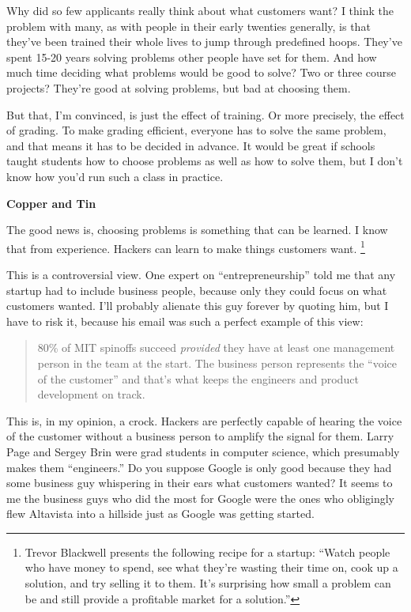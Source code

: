 Why did so few applicants really think about what customers want? I
think the problem with many, as with people in their early twenties
generally, is that they've been trained their whole lives to jump
through predefined hoops. They've spent 15-20 years solving problems
other people have set for them. And how much time deciding what problems
would be good to solve? Two or three course projects? They're good at
solving problems, but bad at choosing them.

But that, I'm convinced, is just the effect of training. Or more
precisely, the effect of grading. To make grading efficient, everyone
has to solve the same problem, and that means it has to be decided in
advance. It would be great if schools taught students how to choose
problems as well as how to solve them, but I don't know how you'd run
such a class in practice.

\textbf{Copper and Tin}

The good news is, choosing problems is something that can be learned. I
know that from experience. Hackers can learn to make things customers
want. \footnote{Trevor Blackwell presents the following recipe for a startup:
``Watch people who have money to spend, see what they're wasting their
time on, cook up a solution, and try selling it to them. It's surprising
how small a problem can be and still provide a profitable market for a
solution.''}

This is a controversial view. One expert on ``entrepreneurship'' told me
that any startup had to include business people, because only they could
focus on what customers wanted. I'll probably alienate this guy forever
by quoting him, but I have to risk it, because his email was such a
perfect example of this view:

\begin{quote}
80\% of MIT spinoffs succeed \emph{provided} they have at least one
management person in the team at the start. The business person
represents the ``voice of the customer'' and that's what keeps the
engineers and product development on track.
\end{quote}

This is, in my opinion, a crock. Hackers are perfectly capable of
hearing the voice of the customer without a business person to amplify
the signal for them. Larry Page and Sergey Brin were grad students in
computer science, which presumably makes them ``engineers.'' Do you
suppose Google is only good because they had some business guy
whispering in their ears what customers wanted? It seems to me the
business guys who did the most for Google were the ones who obligingly
flew Altavista into a hillside just as Google was getting started.

